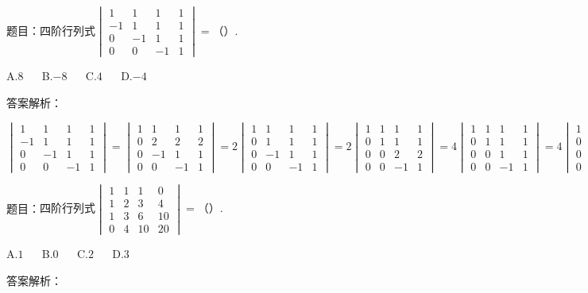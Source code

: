 题目：$\mathrm{四阶行列式}\begin{vmatrix}1&1&1&1\\-1&1&1&1\\0&-1&1&1\\0&0&-1&1\end{vmatrix}=（）.$

A.$8$ $\quad$ B.$-8$ $\quad$ C.$4$ $\quad$ D.$-4$

答案解析：

$\begin{vmatrix}1&1&1&1\\-1&1&1&1\\0&-1&1&1\\0&0&-1&1\end{vmatrix}=\begin{vmatrix}1&1&1&1\\0&2&2&2\\0&-1&1&1\\0&0&-1&1\end{vmatrix}=2\begin{vmatrix}1&1&1&1\\0&1&1&1\\0&-1&1&1\\0&0&-1&1\end{vmatrix}=2\begin{vmatrix}1&1&1&1\\0&1&1&1\\0&0&2&2\\0&0&-1&1\end{vmatrix}=4\begin{vmatrix}1&1&1&1\\0&1&1&1\\0&0&1&1\\0&0&-1&1\end{vmatrix}=4\begin{vmatrix}1&1&1&1\\0&1&1&1\\0&0&1&1\\0&0&0&2\end{vmatrix}=8.$



题目：$\mathrm{四阶行列式}\begin{vmatrix}1&1&1&0\\1&2&3&4\\1&3&6&10\\0&4&10&20\end{vmatrix}=（）.$

A.$1$ $\quad$ B.$0$ $\quad$ C.$2$ $\quad$ D.$3$

答案解析：

